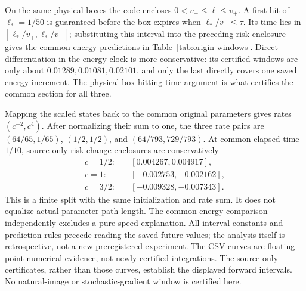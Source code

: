 On the same physical boxes the code encloses $0<v_-\le\dot\ell\le v_+$. A first hit of $\ell_*=1/50$ is guaranteed before the box expires when $\ell_*/v_-\le\tau$. Its time lies in $[\ell_*/v_+,\ell_*/v_-]$; substituting this interval into the preceding risk enclosure gives the common-energy predictions in Table~\ref{tab:origin-windows}. Direct differentiation in the energy clock is more conservative: its certified windows are only about $0.01289,0.01081,0.02101$, and only the last directly covers one saved energy increment. The physical-box hitting-time argument is what certifies the common section for all three.

Mapping the scaled states back to the common original parameters gives rates $(c^{-2},c^4)$. After normalizing their sum to one, the three rate pairs are $(64/65,1/65)$, $(1/2,1/2)$, and $(64/793,729/793)$. At common elapsed time $1/10$, source-only risk-change enclosures are conservatively
\begin{align}
 c=1/2:&\quad[0.004267,0.004917],\nonumber\\
 c=1:&\quad[-0.002753,-0.002162],\\
 c=3/2:&\quad[-0.009328,-0.007343].\nonumber
\end{align}
This is a finite split with the same initialization and rate sum. It does not equalize actual parameter path length. The common-energy comparison independently excludes a pure speed explanation. All interval constants and prediction rules precede reading the saved future values; the analysis itself is retrospective, not a new preregistered experiment. The CSV curves are floating-point numerical evidence, not newly certified integrations. The source-only certificates, rather than those curves, establish the displayed forward intervals. No natural-image or stochastic-gradient window is certified here.
